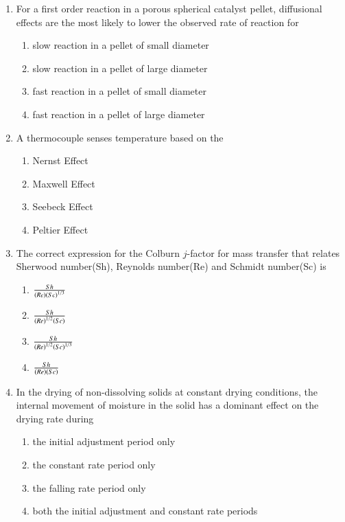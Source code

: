 \documentclass[journal,12pt,onecolumn]{IEEEtran}
\theoremstyle{remark}
\begin{document}
\begin{enumerate}
    \item For a first order reaction in a porous spherical catalyst pellet, diffusional effects are the most likely to lower the observed rate of reaction for

\begin{enumerate}
    \item slow reaction in a pellet of small diameter
    \item slow reaction in a pellet of large diameter
    \item fast reaction in a pellet of small diameter
    \item fast reaction in a pellet of large diameter
\end{enumerate}

      \item  A thermocouple senses temperature based on the 

  

\begin{multicols}{4}
    \begin{enumerate}
        \item Nernst Effect
        \item Maxwell Effect
        \item Seebeck Effect
        \item Peltier Effect
    \end{enumerate}
\end{multicols}

    \item The correct expression for the Colburn $j$-factor for mass transfer that relates Sherwood number(Sh), Reynolds number(Re) and Schmidt number(Sc) is

\begin{multicols}{4}
    \begin{enumerate}
        \item $\frac{Sh}{\left(Re\right)\left(Sc\right)^{1/3}}$
        \item $\frac{Sh}{\left(Re\right)^{1/2}\left(Sc\right)}$
        \item $\frac{Sh}{\left(Re\right)^{1/2}\left(Sc\right)^{1/3}}$
        \item $\frac{Sh}{\left(Re\right)\left(Sc\right)}$
    \end{enumerate}
\end{multicols}

    \item In the drying of non-dissolving solids at constant drying conditions, the internal movement of moisture in the solid has a dominant effect on the drying rate during
\begin{enumerate}
    \item the initial adjustment period only
    \item the constant rate period only
    \item the falling rate period only
    \item both the initial adjustment and constant rate periods
\end{enumerate}


\end{enumerate}
\end{document}
